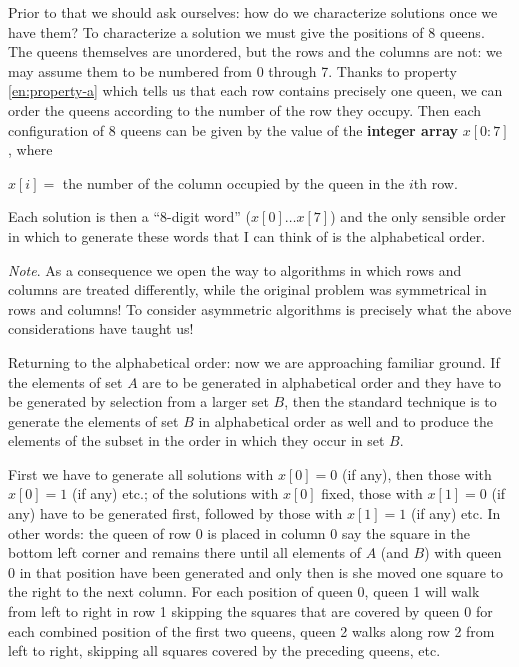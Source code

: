 Prior to that we should ask ourselves: how do we characterize solutions once we have them? To characterize a solution we must give the positions of 8 queens. The queens themselves are unordered, but the rows and the columns are not: we may assume them to be numbered from 0 through 7. Thanks to property \ref{en:property-a} which tells us that each row contains precisely one queen, we can order the queens according to the number of the row they occupy. Then each configuration of 8 queens can be given by the value of the \textbf{integer array} $x[0:7]$, where

\noindent
$x[i] =$ the number of the column occupied by the queen in the $i$th row.

Each solution is then a ``8-digit word'' ($x[0] \dots x[7]$) and the only sensible order in which to generate these words that I can think of is the alphabetical order.

\noindent
\textit{Note}. As a consequence we open the way to algorithms in which rows and columns are treated differently, while the original problem was symmetrical in rows and columns! To consider asymmetric algorithms is precisely what the above considerations have taught us!

Returning to the alphabetical order: now we are approaching familiar ground. If the elements of set $A$ are to be generated in alphabetical order and they have to be generated by selection from a larger set $B$, then the standard technique is to generate the elements of set $B$ in alphabetical order as well and to produce the elements of the subset in the order in which they occur in set $B$.

First we have to generate all solutions with $x[0] = 0$ (if any), then those with $x[0] = 1$ (if any) etc.; of the solutions with $x[0]$ fixed, those with $x[1] = 0$ (if any) have to be generated first, followed by those with $x[1] = 1$ (if any) etc. In other words: the queen of row 0 is placed in column 0 \textemdash{}  say the square in the bottom left corner \textemdash{}  and remains there until all elements of $A$ (and $B$) with queen 0 in that position have been generated and only then is she moved one square to the right to the next column. For each position of queen 0, queen 1 will walk from left to right in row 1 \textemdash{}  skipping the squares that are covered by queen 0 \textemdash{}  for each combined position of the first two queens, queen 2 walks along row 2 from left to right, skipping all squares covered by the preceding queens, etc.

